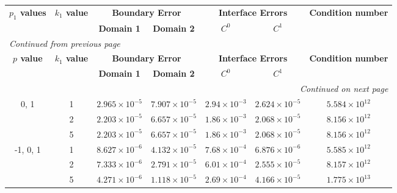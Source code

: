 \begin{table}[!htbp]
    \centering
    \begin{longtable}{ccccccc}
        \toprule
        \multicolumn{1}{c}{\textbf{\(p_1\) values}} & \multicolumn{1}{c}{\textbf{\(k_1\) value}} & \multicolumn{2}{c}{\textbf{Boundary Error}} & \multicolumn{2}{c}{\textbf{Interface Errors}} & \multicolumn{1}{c}{\textbf{Condition number}} \\
        \cmidrule(lr){2-2} \cmidrule(lr){3-4} \cmidrule(lr){5-6} \cmidrule(lr){7-7}
        & & \textbf{Domain 1} & \textbf{Domain 2} & \textbf{\(C^0\)} & \textbf{\(C^1\)} & \\
        \midrule
        \endfirsthead %
        \multicolumn{7}{l}{{\footnotesize\emph{Continued from previous page}}} \\
        \toprule
        \multicolumn{1}{c}{\textbf{\(p\) value}} & \multicolumn{1}{c}{\textbf{\(k_1\) value}} & \multicolumn{2}{c}{\textbf{Boundary Error}} & \multicolumn{2}{c}{\textbf{Interface Errors}} & \multicolumn{1}{c}{\textbf{Condition number}} \\
        \cmidrule(lr){2-2} \cmidrule(lr){3-4} \cmidrule(lr){5-6} \cmidrule(lr){7-7}
        & & \textbf{Domain 1} & \textbf{Domain 2} & \textbf{\(C^0\)} & \textbf{\(C^1\)} & \\
        \midrule
        \endhead %
        \midrule[\heavyrulewidth] %
        \multicolumn{7}{r}{{\footnotesize\emph{Continued on next page}}} \\
        \endfoot %
        \bottomrule
        \endlastfoot %
        
        0, 1 & 1 & $2.965\times10^{-5}$ & $7.907\times10^{-5}$ & $2.94\times10^{-3}$ & $2.624\times10^{-5}$ & $5.584\times10^{12}$ \\
        & 2 & $2.203\times10^{-5}$ & $6.657\times10^{-5}$ & $1.86\times10^{-3}$ & $2.068\times10^{-5}$ & $8.156\times10^{12}$ \\
        & 5 & $2.203\times10^{-5}$ & $6.657\times10^{-5}$ & $1.86\times10^{-3}$ & $2.068\times10^{-5}$ & $8.156\times10^{12}$ \\
        \midrule[\heavyrulewidth] %
        
        -1, 0, 1 & 1 & $8.627\times10^{-6}$ & $4.132\times10^{-5}$ & $7.68\times10^{-4}$ & $6.876\times10^{-6}$ & $5.585\times10^{12}$ \\
        & 2 & $7.333\times10^{-6}$ & $2.791\times10^{-5}$ & $6.01\times10^{-4}$ & $2.555\times10^{-5}$ & $8.157\times10^{12}$ \\
        & 5 & $4.271\times10^{-6}$ & $1.118\times10^{-5}$ & $2.69\times10^{-4}$ & $4.166\times10^{-5}$ & $1.775\times10^{13}$ \\
        \midrule[\heavyrulewidth] %


\end{longtable}
\end{table}
